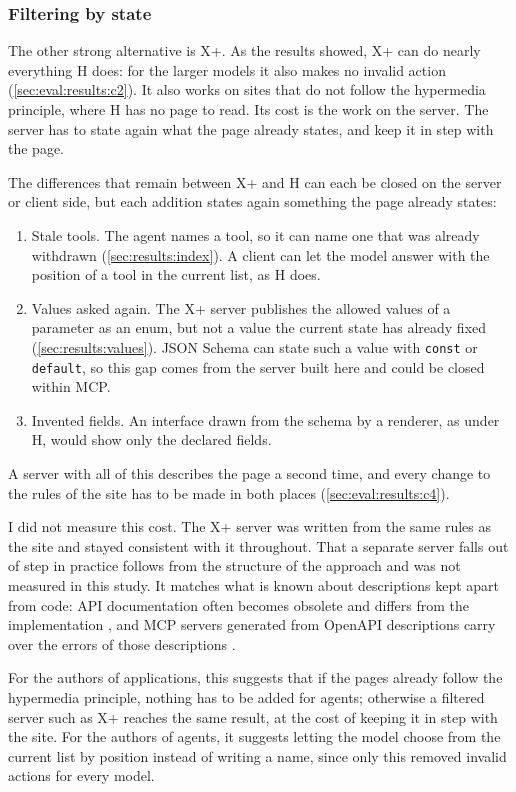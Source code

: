 \subsubsection{Filtering by state}\label{sec:disc:restate}

The other strong alternative is X+.
As the results showed, X+ can do nearly everything H does: for the larger models it also makes no invalid action (\autoref{sec:eval:results:c2}).
It also works on sites that do not follow the hypermedia principle, where H has no page to read.
Its cost is the work on the server.
The server has to state again what the page already states, and keep it in step with the page.

The differences that remain between X+ and H can each be closed on the server or client side, but each addition states again something the page already states:
\begin{enumerate}
    \item Stale tools.
    The agent names a tool, so it can name one that was already withdrawn (\autoref{sec:results:index}).
    A client can let the model answer with the position of a tool in the current list, as H does.
    \item Values asked again.
    The X+ server publishes the allowed values of a parameter as an enum, but not a value the current state has already fixed (\autoref{sec:results:values}).
    JSON Schema can state such a value with \texttt{const} or \texttt{default}, so this gap comes from the server built here and could be closed within MCP.
    \item Invented fields.
    An interface drawn from the schema by a renderer, as under H, would show only the declared fields.
\end{enumerate}
A server with all of this describes the page a second time, and every change to the rules of the site has to be made in both places (\autoref{sec:eval:results:c4}).

I did not measure this cost.
The X+ server was written from the same rules as the site and stayed consistent with it throughout.
That a separate server falls out of step in practice follows from the structure of the approach and was not measured in this study.
It matches what is known about descriptions kept apart from code: API documentation often becomes obsolete and differs from the implementation \cite{uddin2015how}, and MCP servers generated from OpenAPI descriptions carry over the errors of those descriptions \cite{mastouri2026rest}.

For the authors of applications, this suggests that if the pages already follow the hypermedia principle, nothing has to be added for agents; otherwise a filtered server such as X+ reaches the same result, at the cost of keeping it in step with the site.
For the authors of agents, it suggests letting the model choose from the current list by position instead of writing a name, since only this removed invalid actions for every model.

